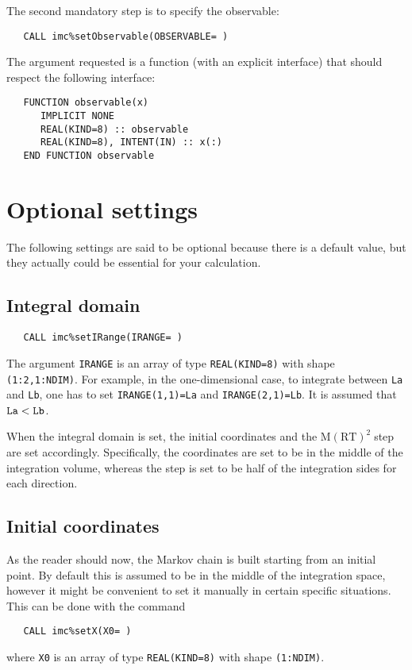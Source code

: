 \documentclass[11pt,a4paper,twoside]{article}
\newcommand{\MRTWO}{$ \text{M}(\text{RT})^2 \;$}
\begin{document}
The second mandatory step is to specify the observable:
\begin{verbatim}
   CALL imc%setObservable(OBSERVABLE= )
\end{verbatim}
The argument requested is a function (with an explicit interface) that should respect the following interface:
\begin{verbatim}
   FUNCTION observable(x)
      IMPLICIT NONE
      REAL(KIND=8) :: observable
      REAL(KIND=8), INTENT(IN) :: x(:)
   END FUNCTION observable
\end{verbatim}



\section{Optional settings}
The following settings are said to be optional because there is a default value, but they actually could be essential for your calculation.

\subsection{Integral domain} %
\label{sub:integral_domain}
\begin{verbatim}
   CALL imc%setIRange(IRANGE= )
\end{verbatim}
The argument \verb+IRANGE+ is an array of type \verb+REAL(KIND=8)+ with shape \verb+(1:2,1:NDIM)+. For example, in the one-dimensional case, to integrate between \verb+La+ and \verb+Lb+, one has to set \verb+IRANGE(1,1)=La+ and \verb+IRANGE(2,1)=Lb+. It is assumed that $\verb+La+ < \verb+Lb+$.

When the integral domain is set, the initial coordinates and the \MRTWO step are set accordingly.
Specifically, the coordinates are set to be in the middle of the integration volume, whereas the step is set to be half of the integration sides for each direction.

\subsection{Initial coordinates} %
\label{sub:starting_coordinates}
As the reader should now, the Markov chain is built starting from an initial point.
By default this is assumed to be in the middle of the integration space, however it might be convenient to set it manually in certain specific situations.
This can be done with the command
\begin{verbatim}
   CALL imc%setX(X0= )
\end{verbatim}
where \verb+X0+ is an array of type \verb+REAL(KIND=8)+ with shape \verb+(1:NDIM)+.
\end{document}
